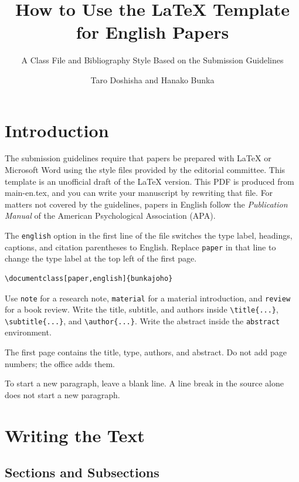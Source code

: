 \documentclass[paper,english]{bunkajoho}
\title{How to Use the \LaTeX{} Template for English Papers}
\subtitle{A Class File and Bibliography Style Based on the Submission Guidelines}   %
\author{Taro Doshisha and Hanako Bunka}                                              %
\begin{document}
\maketitle   %

\section{Introduction}

The submission guidelines require that papers be prepared with \LaTeX{} or Microsoft Word using the style files provided by the editorial committee.
This template is an unofficial draft of the \LaTeX{} version.
This PDF is produced from main-en.tex, and you can write your manuscript by rewriting that file.
For matters not covered by the guidelines, papers in English follow the \textit{Publication Manual} of the American Psychological Association (APA).

The \verb|english| option in the first line of the file switches the type label, headings, captions, and citation parentheses to English.
Replace \verb|paper| in that line to change the type label at the top left of the first page.
\begin{verbatim}
\documentclass[paper,english]{bunkajoho}
\end{verbatim}
Use \verb|note| for a research note, \verb|material| for a material introduction, and \verb|review| for a book review.
Write the title, subtitle, and authors inside \verb|\title{...}|, \verb|\subtitle{...}|, and \verb|\author{...}|.
Write the abstract inside the \verb|abstract| environment.

The first page contains the title, type, authors, and abstract.
Do not add page numbers; the office adds them.

To start a new paragraph, leave a blank line.
A line break in the source alone does not start a new paragraph.

\section{Writing the Text}

\subsection{Sections and Subsections}
\end{document}
